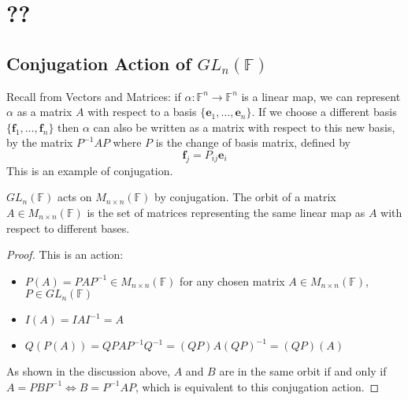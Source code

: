 \documentclass{article}
\begin{document}
	\section{??}
	\subsection{Conjugation Action of $GL_n(\mathbb F)$}
	Recall from Vectors and Matrices: if $\alpha\colon \mathbb F^n \to \mathbb F^n$ is a linear map, we can represent $\alpha$ as a matrix $A$ with respect to a basis $\{ \bm e_1, \dots, \bm e_n \}$. If we choose a different basis $\{ \bm f_1, \dots, \bm f_n \}$ then $\alpha$ can also be written as a matrix with respect to this new basis, by the matrix $P^{-1}AP$ where $P$ is the change of basis matrix, defined by
	\[ \bm f_j = P_{ij}\bm e_i \]
	This is an example of conjugation.
	\begin{proposition}
		$GL_n(\mathbb F)$ acts on $M_{n \times n}(\mathbb F)$ by conjugation. The orbit of a matrix $A \in M_{n \times n}(\mathbb F)$ is the set of matrices representing the same linear map as $A$ with respect to different bases.
	\end{proposition}
	\begin{proof}
		This is an action:
		\begin{itemize}
			\item $P(A) = PAP^{-1} \in M_{n \times n}(\mathbb F)$ for any chosen matrix $A \in M_{n \times n}(\mathbb F)$, $P \in GL_n(\mathbb F)$
			\item $I(A) = IAI^{-1} = A$
			\item $Q(P(A)) = QPAP^{-1}Q^{-1} = (QP)A(QP)^{-1} = (QP)(A)$
		\end{itemize}
		As shown in the discussion above, $A$ and $B$ are in the same orbit if and only if $A = PBP^{-1} \iff B = P^{-1}AP$, which is equivalent to this conjugation action.
	\end{proof}
\end{document}
